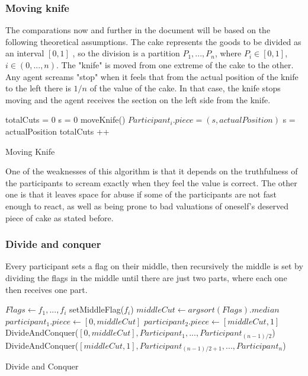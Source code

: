 \subsubsection{Moving knife}\cite{Lang09}
The comparations now and further in the document will be based on the following theoretical assumptions.
The cake represents the goods to be divided as an interval $[0,1]$ , so the division is a partition $P_1,..., P_n$, where $P_i \in [0,1]$, $i \in (0,...,n)$.
The "knife" is moved from one extreme of the cake to the other. Any agent screams "stop" when it feels that from the actual position of the knife to the left there is $1/n$ of the value of the cake. In that case, the knife stops moving and the agent receives the section on the left side from the knife.
\begin{algorithm}[H]
\SetAlgoLined
{}
totalCuts = 0\;
s = 0\;
{
  	moveKnife()\;
       {
       $Participant_i.piece = (s,actualPosition)$\;
       s = actualPosition\;
       totalCuts ++\;
       }
}

 \caption{Moving Knife}
\end{algorithm}

One of the weaknesses of this algorithm is that it depends on the truthfulness of the participants to scream exactly when they feel the value is correct. The other one is that it leaves space for abuse if some of the participants are not fast enough to react, as well as being prone to bad valuations of oneself's deserved piece of cake as stated before.


\subsubsection{Divide and conquer}
Every participant sets a flag on their middle, then recursively the middle is set by dividing the flags in the middle until there are just two parts, where each one then receives one part.
\begin{algorithm}[H]
\SetAlgoLined
{}

$Flags \gets f_1,...,f_i$ \;
  {
  setMiddleFlag($f_i$)\;
  }
$middleCut \gets argsort(Flags).median$\;
{
  $participant_1.piece \gets [0,middleCut]$\;
  $participant_2.piece \gets [middleCut,1]$\;
}
\Else
{
  DivideAndConquer($[0,middleCut], Participant_1,...,Participant_{(n-1)/2}$)\;
  DivideAndConquer($[middleCut,1], Participant_{(n-1)/2+1},...,Participant_n$)\;
}

 \caption{Divide and Conquer}
\end{algorithm}

